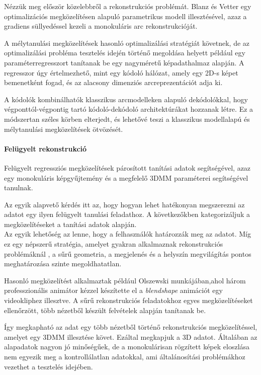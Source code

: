 \documentclass[12pt,a4]{article}
\begin{document}
	
	Nézzük meg először közelebbről a rekonstrukciós problémát. Blanz és Vetter \cite{blanzvetter} egy optimalizációs megközelítésen alapuló parametrikus modell illesztésével, azaz a gradiens süllyedéssel kezeli a monokuláris arc rekonstrukcióját. 
	
	 A mélytanulási megközelítések hasonló optimalizálási stratégiát követnek, de az optimalizálási probléma 
	tesztelés idején történő megoldása helyett például egy paraméterregresszort tanítanak be egy nagyméretű képadathalmaz alapján. A regresszor úgy értelmezhető, mint egy kódoló hálózat, amely egy 2D-s képet
	bemenetként fogad, és az alacsony dimenziós arcreprezentációt adja ki. 
	
	A
	kódolók kombinálhatók klasszikus arcmodelleken alapuló dekódolókkal,
	hogy végponttól-végpontig tartó kódoló-dekódoló architektúrákat hozzanak létre.
	Ez a módszertan széles körben elterjedt, és lehetővé teszi a klasszikus
	modellalapú és mélytanulási megközelítések ötvözését.
	
	\paragraph{Felügyelt rekonstrukció}
	Felügyelt regressziós megközelítések
	párosított tanítási adatok segítségével, azaz egy monokuláris  képgyűjtemény
	és a megfelelő 3DMM paraméterei segítségével tanulnak.
	
	Az egyik alapvető kérdés itt az, hogy hogyan lehet hatékonyan megszerezni az adatot egy ilyen felügyelt tanulási feladathoz. A következőkben
	kategorizáljuk a megközelítéseket a
	tanítási adatok alapján. \\
	
	Az egyik lehetőség az lenne, hogy a felhasználók határozzák meg az adatot. Míg ez egy népszerű stratégia, amelyet gyakran alkalmaznak rekonstrukciós problémáknál \cite{saragih}, 
	a sűrű geometria, a megjelenés és a helyszín megvilágítás pontos meghatározása szinte megoldhatatlan.
	
	Hasonló megközelítést alkalmaztak például Olszewski \cite{olszewski} munkájában,ahol három professzionális animátor kézzel készítette el a \textit{blendshape} animációt egy videokliphez illesztve. A sűrű rekonstrukciós feladatokhoz egyes megközelítéseket ellenőrzött, több nézetből készült felvételek alapján tanítanak be.
	
	Így megkapható az adat egy több nézetből történő rekonstrukciós megközelítéssel, amelyet egy 3DMM illesztése követ. Ezáltal megkapjuk a 3D adatot. Általában az alapadatok nagyon jó minőségűek,
	de a monokulárisan rögzített képek eloszlása nem
	egyezik meg a kontrollálatlan adatokkal, ami általánosítási problémákhoz vezethet
	a tesztelés idejében.\\
	
\end{document}
